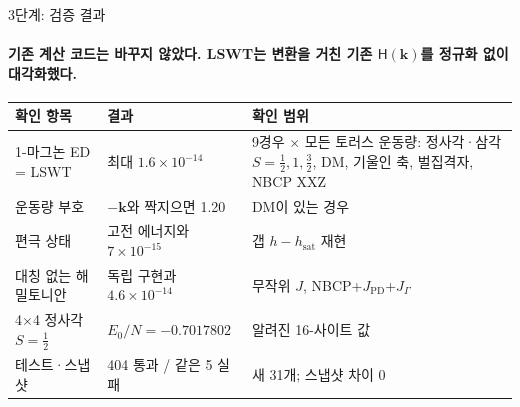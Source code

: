 \begin{frame}[label=stage3-verification]{3단계: 검증 결과}
  \framesubtitle{기존 계산 코드는 바꾸지 않았다. LSWT는 변환을 거친 기존 $\mathsf H(\mathbf k)$를 정규화 없이 대각화했다.}
  \small
  \begin{tabularx}{\textwidth}{@{}P{3.0cm}P{2.9cm}Y@{}}
    \toprule
    확인 항목 & 결과 & 확인 범위 \\
    -마그논 ED = LSWT & 최대 $1.6\times10^{-14}$ & 9경우 $\times$ 모든 토러스 운동량: 정사각·삼각 $S=\tfrac12,1,\tfrac32$, DM, 기울인 축, 벌집격자, NBCP XXZ \\
    운동량 부호 & $-\mathbf k$와 짝지으면 1.20 & DM이 있는 경우 \\
    편극 상태 & 고전 에너지와 $7\times10^{-15}$ & 갭 $h-h_{\mathrm{sat}}$ 재현 \\
    대칭 없는 해밀토니안 & 독립 구현과 $4.6\times10^{-14}$ & 무작위 $J$, NBCP+$J_{\mathrm{PD}}$+$J_\Gamma$ \\
    4$\times$4 정사각 $S=\tfrac12$ & $E_0/N=-0.7017802$ & 알려진 16-사이트 값 \\
    테스트·스냅샷 & 404 통과 / 같은 5 실패 & 새 31개; 스냅샷 차이 0 \\
    \bottomrule
  \end{tabularx}
  \par\medskip
\end{frame}

